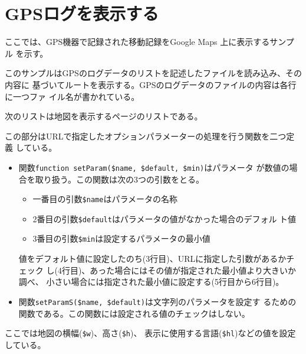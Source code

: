 \section{GPSログを表示する}
ここでは、GPS機器で記録された移動記録をGoogle Maps 上に表示するサンプル
を示す。

このサンプルはGPSのログデータのリストを記述したファイルを読み込み、その内容に
基づいてルートを表示する。GPSのログデータのファイルの内容は各行に一つファ
イル名が書かれている。

次のリストは地図を表示するページのリストである。
この部分はURLで指定したオプションパラメーターの処理を行う関数を二つ定義
している。
\begin{itemize}
 \item 関数\verb+function setParam($name, $default, $min)+はパラメータ
       が数値の場合を取り扱う。この関数は次の3つの引数をとる。
\begin{itemize}
 \item 一番目の引数\verb+$name+はパラメータの名称
 \item 2番目の引数\verb+$default+はパラメータの値がなかった場合のデフォル
       ト値
 \item 3番目の引数\verb+$min+は設定するパラメータの最小値
\end{itemize}
値をデフォルト値に設定したのち(3行目)、URLに指定した引数があるかチェック
       し(4行目)、あった場合にはその値が指定された最小値より大きいか調べ、
       小さい場合には指定された最小値に設定する(5行目から6行目)。
 \item 関数\verb+setParamS($name, $default)+は文字列のパラメータを設定す
       るための関数である。この関数には設定される値のチェックはしない。
\end{itemize}
ここでは地図の横幅(\verb+$w+)、高さ(\verb+$h+)、
表示に使用する言語(\verb+$hl+)などの値を設定している。
